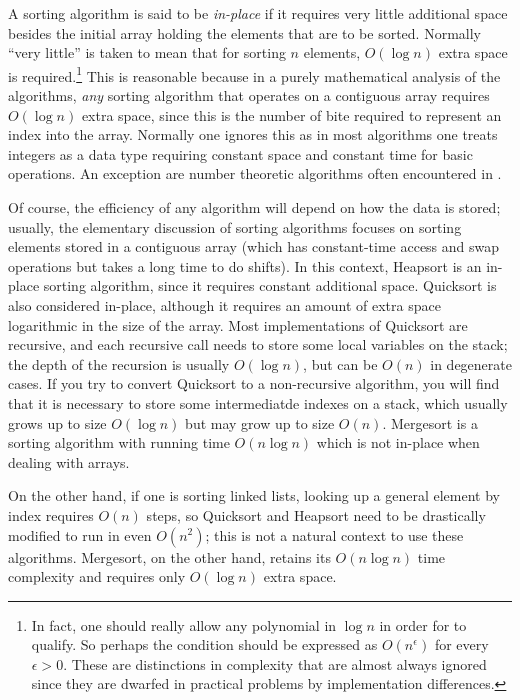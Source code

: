 \documentclass[12pt]{article}
\begin{document}
A sorting algorithm is said to be \emph{in-place} if it requires very little additional space besides the initial array holding the elements that are to be sorted.  Normally ``very little'' is taken to mean that for sorting $n$ elements, $O(\log n)$ extra space is required.\footnote{In fact, one should really allow any polynomial in $\log n$ in order for  to qualify.  So perhaps the condition should be expressed as $O(n^\epsilon)$ for every $\epsilon>0$.  These are distinctions in complexity that are almost always ignored since they are dwarfed in practical problems by implementation differences.}  This is reasonable because in a purely mathematical analysis of the algorithms, \emph{any} sorting algorithm that operates on a contiguous array requires $O(\log n)$ extra space, since this is the number of bite required to represent an index into the array.  Normally one ignores this as in most algorithms one treats integers as a data type requiring constant space and constant time for basic operations.  An exception are number theoretic algorithms often encountered in .

Of course, the efficiency of any algorithm will depend on how the data is stored; usually, the elementary discussion of sorting algorithms focuses on sorting elements stored in a contiguous array (which has constant-time access and swap operations but takes a long time to do shifts).  In this context, Heapsort is an in-place sorting algorithm, since it requires constant additional space. Quicksort is also considered in-place, although it requires an amount of extra space logarithmic in the size of the array.  Most implementations of Quicksort are recursive, and each recursive call needs to store some local variables on the stack; the depth of the recursion is usually $O(\log n)$, but can be $O(n)$ in degenerate cases.  If you try to convert Quicksort to a non-recursive algorithm, you will find that it is necessary to store some intermediatde indexes on a stack, which usually grows up to size $O(\log n)$ but may grow up to size $O(n)$.  Mergesort is a sorting algorithm with running time $O(n\log n)$ which is not in-place when dealing with arrays. 

On the other hand, if one is sorting linked lists, looking up a general element by index requires $O(n)$ steps, so Quicksort and Heapsort need to be drastically modified to run in even $O(n^2)$; this is not a natural context to use these algorithms.  Mergesort, on the other hand, retains its $O(n\log n)$ time complexity and requires only $O(\log n)$ extra space. 
\end{document}
